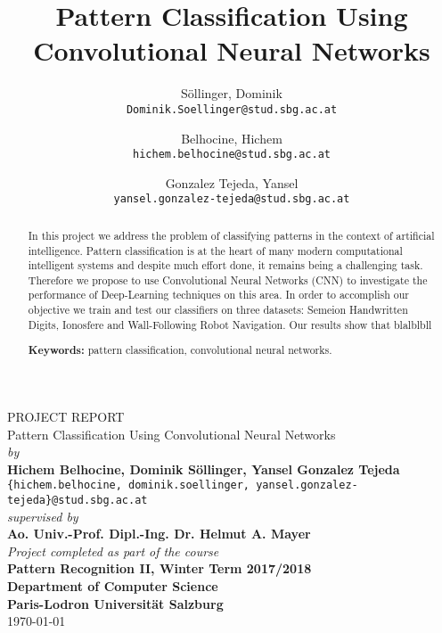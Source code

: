 \documentclass[a4paper, 11pt, twoside, openright]{article}
\author{
	Söllinger, Dominik\\
	\texttt{Dominik.Soellinger@stud.sbg.ac.at}
	\and
	Belhocine, Hichem\\
	\texttt{hichem.belhocine@stud.sbg.ac.at}
	\and
	Gonzalez Tejeda, Yansel\\
	\texttt{yansel.gonzalez-tejeda@stud.sbg.ac.at}
}
\title{Pattern Classification Using Convolutional Neural Networks}
\begin{document}
	\begin{titlepage}
		\centering
		\vfill
		\LARGE{PROJECT REPORT}\\
		\vspace{1cm}
		\LARGE{Pattern Classification Using Convolutional Neural Networks}\\
		\vspace{1cm}
		\normalsize{\textit{by}}\\
		\vspace{1cm}
		\normalsize{\textbf{Hichem Belhocine, Dominik Söllinger,  Yansel Gonzalez Tejeda}}\\
		\normalsize{\texttt{\{hichem.belhocine, dominik.soellinger, yansel.gonzalez-tejeda\}@stud.sbg.ac.at}}\\
		\vspace{1cm}
		\normalsize{\textit{supervised by}}\\
		\vspace{1cm}
		\normalsize{\textbf{Ao. Univ.-Prof. Dipl.-Ing. Dr. Helmut A. Mayer}}\\
		\vspace{1cm}
		\normalsize{\textit{Project completed as part of the course}}\\
		\vspace{1cm}
		\normalsize{\textbf{Pattern Recognition II, Winter Term 2017/2018}}\\
		\vspace{1cm}
		\normalsize{\textbf{Department of Computer Science}}\\
		\vspace{1cm}
		\normalsize{\textbf{Paris-Lodron Universität Salzburg}}\\
		\vfill
		\today
	\end{titlepage}
	\clearpage %
	\begingroup
	\pagestyle{empty}
	\null
	\newpage
	\endgroup

\begin{abstract}
In this project we address the problem of classifying patterns in the context of artificial intelligence. Pattern classification is at the heart of many modern computational intelligent systems and despite much effort done, it remains being a challenging task. Therefore we propose to use Convolutional Neural Networks (CNN) to investigate the performance of Deep-Learning techniques on this area. In order to accomplish our objective we train and test our classifiers on three datasets: Semeion Handwritten Digits, Ionosfere and Wall-Following Robot Navigation. Our results show that blalblbll

\noindent\textbf{Keywords:} pattern classification, convolutional neural networks.
\end{abstract}
\end{document}
